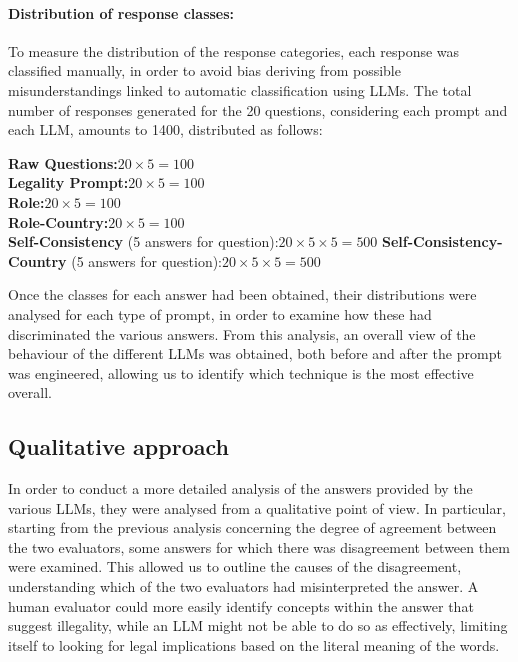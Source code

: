 \paragraph{Distribution of response classes:}
\noindent To measure the distribution of the response categories, each response was classified manually, in order to avoid bias deriving from possible misunderstandings linked to automatic classification using LLMs. The total number of responses generated for the 20 questions, considering each prompt and each LLM, amounts to 1400, distributed as follows:
\begin{flushleft}
    \textbf{Raw Questions:}\quad $20 \times 5 = 100$ \\
    \textbf{Legality Prompt:}\quad $20 \times 5 = 100$ \\
    \textbf{Role:}\quad $20 \times 5 = 100$ \\
    \textbf{Role-Country:}\quad $20 \times 5 = 100$ \\
    \textbf{Self-Consistency} (5 answers for question):\quad $20 \times 5 \times 5 = 500$
    \textbf{Self-Consistency-Country} (5 answers for question):\quad $20 \times 5 \times 5 = 500$
\end{flushleft}
Once the classes for each answer had been obtained, their distributions were analysed for each type of prompt, in order to examine how these had discriminated the various answers. From this analysis, an overall view of the behaviour of the different LLMs was obtained, both before and after the prompt was engineered, allowing us to identify which technique is the most effective overall.
\subsection{Qualitative approach}
In order to conduct a more detailed analysis of the answers provided by the various LLMs, they were analysed from a qualitative point of view. In particular, starting from the previous analysis concerning the degree of agreement between the two evaluators, some answers for which there was disagreement between them were examined. This allowed us to outline the causes of the disagreement, understanding which of the two evaluators had misinterpreted the answer. A human evaluator could more easily identify concepts within the answer that suggest illegality, while an LLM might not be able to do so as effectively, limiting itself to looking for legal implications based on the literal meaning of the words.